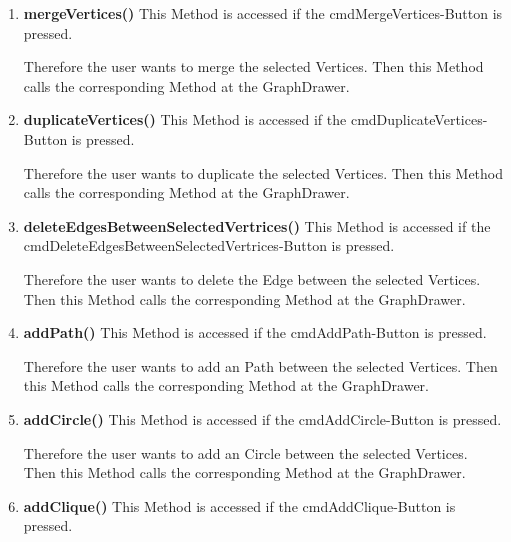 \documentclass{article}
\begin{document}
\begin{enumerate}[-]
{						Therefore the user wants to delete the selected Vertex.
						Then this Method calls the corresponding Method at the GraphDrawer.
						\newline
					}
					\item{
						\textbf{mergeVertices()} \newline
						This Method is accessed if the cmdMergeVertices-Button is pressed.
						
						Therefore the user wants to merge the selected Vertices.
						Then this Method calls the corresponding Method at the GraphDrawer.
						\newline
					}
					\item{
						\textbf{duplicateVertices()} \newline
						This Method is accessed if the cmdDuplicateVertices-Button is pressed.
						
						Therefore the user wants to duplicate the selected Vertices.
						Then this Method calls the corresponding Method at the GraphDrawer.
						\newline
					}
					\item{
						\textbf{deleteEdgesBetweenSelectedVertrices()} \newline
						This Method is accessed if the cmdDeleteEdgesBetweenSelectedVertrices-Button is pressed.
						
						Therefore the user wants to delete the Edge between the selected Vertices.
						Then this Method calls the corresponding Method at the GraphDrawer.
						\newline
					}
					\item{
						\textbf{addPath()} \newline
						This Method is accessed if the cmdAddPath-Button is pressed.
						
						Therefore the user wants to add an Path between the selected Vertices.
						Then this Method calls the corresponding Method at the GraphDrawer.
						\newline
					}
					\item{
						\textbf{addCircle()} \newline
						This Method is accessed if the cmdAddCircle-Button is pressed.
						
						Therefore the user wants to add an Circle between the selected Vertices.
						Then this Method calls the corresponding Method at the GraphDrawer.
						\newline
					}
					\item{
						\textbf{addClique()} \newline
						This Method is accessed if the cmdAddClique-Button is pressed.
						
}
\end{enumerate}
\end{document}
